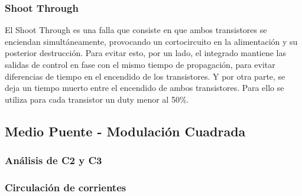 \documentclass[e4_tp3_main.tex]{subfiles}
\begin{document}
\subsubsection{Shoot Through}

El Shoot Through es una falla que consiste en que ambos transistores se enciendan simultáneamente, provocando un cortocircuito en la alimentación y su posterior destrucción. Para evitar esto, por un lado, el integrado mantiene las salidas de control en fase con el mismo tiempo de propagación, para evitar diferencias de tiempo en el encendido de los transistores. Y por otra parte, se deja un tiempo muerto entre el encendido de ambos transistores. Para ello se utiliza para cada transistor un duty menor al 50\%.

\subsection{Medio Puente - Modulación Cuadrada}

\subsubsection{Análisis de C2 y C3}

\subsubsection{Circulación de corrientes}
\end{document}

